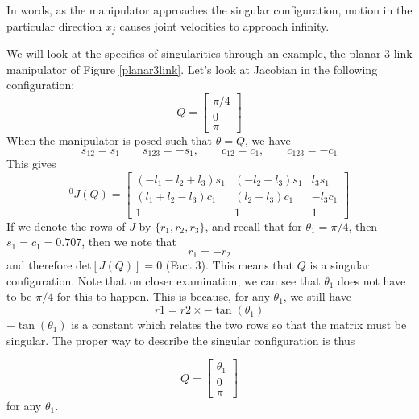 In words, as the manipulator approaches the singular configuration, motion in the particular direction $\dot{x}_j$ causes joint velocities to approach infinity.




\begin{ExampleSmall}\label{JacobianSingOne}
We will look at the specifics of singularities through an example, the planar 3-link manipulator of Figure \ref{planar3link}.   Let's look at Jacobian in the following configuration:
\[
Q = \left [ \begin{array}{c}
\pi/4 \\ 0 \\ \pi
\end{array} \right ]
\]
When the manipulator is posed such that $\theta = Q$, we have
\[
s_{12} = s_1 \qquad s_{123} = -s_1, \qquad c_{12} = c_1, \qquad c_{123} = -c_1
\]
This gives
\[
^0J(Q) = \begin{bmatrix}
(-l_1-l_2+l_3)s_1 & (-l_2+l_3)s_1  & l_3s_1        \\
(l_1+l_2-l_3)c_1  & (l_2-l_3)c_1   & -l_3c_1        \\
1 & 1 & 1
\end{bmatrix}
\]
If we denote the rows of $J$ by $\{r_1,r_2,r_3\}$, and recall that for $\theta_1=\pi/4$, then $s_1=c_1=0.707$, then we note that
\[
r_1 = -r_2
\]
and therefore det$[J(Q)]=0$ (Fact 3). This means that $Q$ is a singular configuration.  Note that on closer examination, we can see that $\theta_1$ does not have to be $\pi/4$ for this to happen.  This is because, for any $\theta_1$, we still have
\[
r1 = r2\times -\tan(\theta_1)
\]
$-\tan(\theta_1)$ is a constant which relates the two rows so that the matrix must be singular.   The proper way to describe the singular configuration is thus

\[
Q = \left [ \begin{array}{c}
\theta_1 \\ 0 \\ \pi
\end{array} \right ]
\]
for any $\theta_1$.

\end{ExampleSmall}



